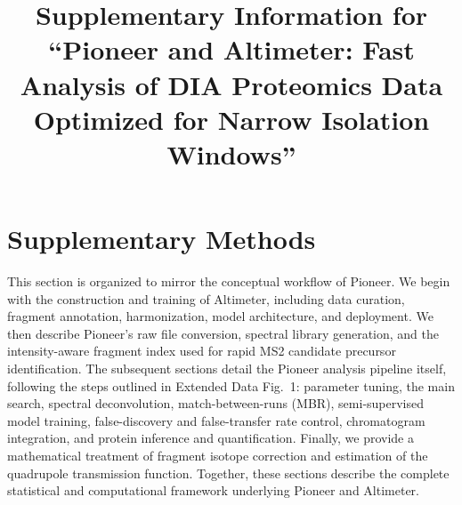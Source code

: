 \documentclass[pdflatex,sn-nature]{sn-jnl}
\begin{document}
\linenumbers
\title[Supplementary Information]{Supplementary Information for ``Pioneer and Altimeter: Fast Analysis of DIA Proteomics Data Optimized for Narrow Isolation Windows''}

\author[1]{ }
\author[1]{ }
\author[1,2]{ }
\author*[1,3]{ }


\maketitle





\section{Supplementary Methods}\label{sec:supplementary-methods}
This section is organized to mirror the conceptual workflow of Pioneer. We begin with the construction and training of Altimeter, including data curation, fragment annotation, harmonization, model architecture, and deployment. We then describe Pioneer's raw file conversion, spectral library generation, and the intensity-aware fragment index used for rapid MS2 candidate precursor identification. The subsequent sections detail the Pioneer analysis pipeline itself, following the steps outlined in Extended Data Fig.~1: parameter tuning, the main search, spectral deconvolution, match-between-runs (MBR), semi-supervised model training, false-discovery and false-transfer rate control, chromatogram integration, and protein inference and quantification. Finally, we provide a mathematical treatment of fragment isotope correction and estimation of the quadrupole transmission function. Together, these sections describe the complete statistical and computational framework underlying Pioneer and Altimeter.
\end{document}
